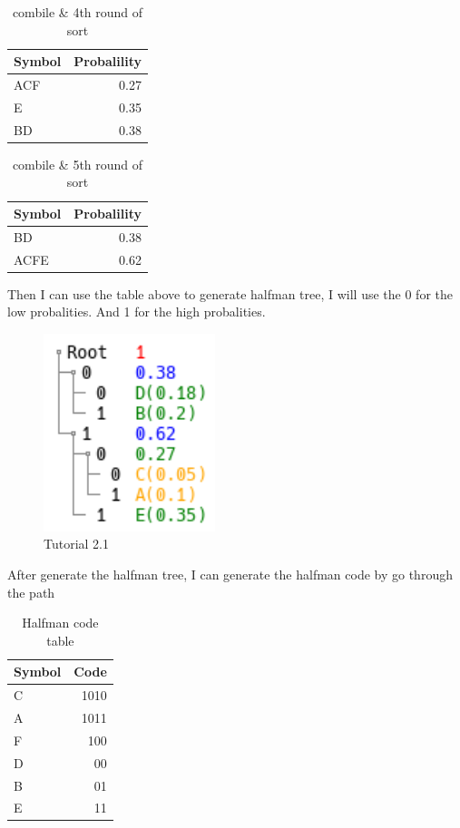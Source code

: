 \documentclass[titlepage]{article}
\begin{document}
\begin{table}[htbp]
\caption{\label{fig:label}combile \& 4th round of sort}
\centering
\begin{tabular}{lr}
Symbol & Probalility\\
\hline
ACF & 0.27\\
E & 0.35\\
BD & 0.38\\
\end{tabular}
\end{table}

\begin{table}[htbp]
\caption{\label{fig:label}combile \& 5th round of sort}
\centering
\begin{tabular}{lr}
Symbol & Probalility\\
\hline
BD & 0.38\\
ACFE & 0.62\\
\end{tabular}
\end{table}

Then I can use the table above to generate halfman tree, I will use the 0 for the low probalities. And 1 for the high probalities.

\begin{figure}[htbp]
\centering
\includegraphics[width=5cm]{img/btree1.png}
\caption{\label{fig:1}Tutorial 2.1}
\end{figure}

After generate the halfman tree, I can generate the halfman code by go through the path

\begin{table}[htbp]
\caption{Halfman code table}
\centering
\begin{tabular}{lr}
Symbol & Code\\
\hline
C & 1010\\
A & 1011\\
F & 100\\
D & 00\\
B & 01\\
E & 11\\
\end{tabular}
\end{table}
\end{document}
